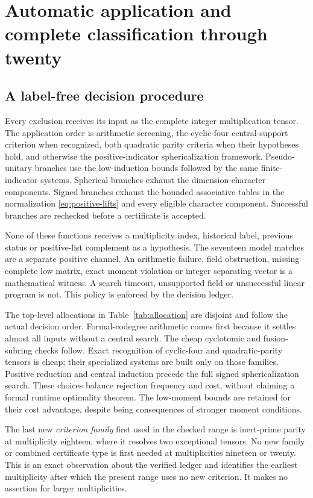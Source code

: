 \section{Automatic application and complete classification through twenty}\label{sec:automatic}
\subsection{A label-free decision procedure}
Every exclusion receives its input as the complete integer multiplication
tensor. The application order is arithmetic screening, the cyclic-four
central-support criterion when recognized, both quadratic parity
criteria when their hypotheses hold, and otherwise the positive-indicator sphericalization
framework. Pseudo-unitary branches use the low-induction bounds followed
by the same finite-indicator systems. Spherical branches exhaust the
dimension-character components. Signed branches exhaust the bounded
associative tables in the normalization \eqref{eq:positive-lifts} and
every eligible character component. Successful branches are rechecked
before a certificate is accepted.

None of these functions receives a multiplicity index, historical label,
previous status or positive-list complement as a hypothesis. The
seventeen model matches are a separate positive channel. An arithmetic
failure, field obstruction, missing complete low matrix, exact moment
violation or integer separating vector is a mathematical witness. A
search timeout, unsupported field or unsuccessful linear program is not.
This policy is enforced by the decision ledger.

The top-level allocations in Table~\ref{tab:allocation} are disjoint and
follow the actual decision order. Formal-codegree arithmetic comes first
because it settles almost all inputs without a central search. The
cheap cyclotomic and fusion-subring checks follow. Exact recognition of
cyclic-four and quadratic-parity tensors is cheap; their specialized
systems are built only on those families. Positive reduction and central
induction precede the full signed sphericalization search. These choices
balance rejection frequency and cost, without claiming a formal runtime
optimality theorem. The low-moment bounds are retained for their cost
advantage, despite being consequences of stronger moment conditions.




The last new \emph{criterion family} first used in the checked range is
inert-prime parity at multiplicity eighteen, where it resolves two
exceptional tensors. No new family or combined certificate type
is first needed at multiplicities nineteen or twenty. This is an exact
observation about the verified ledger and identifies the earliest
multiplicity after which the present range uses no new criterion.
It makes no assertion for larger multiplicities.

